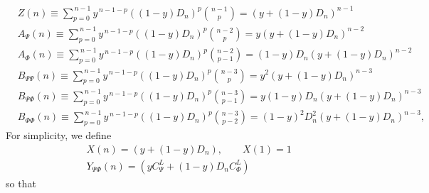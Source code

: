 \documentclass[11pt]{article}
\newcommand{\nn}{\nonumber}
\begin{document}
  \begin{align}
     & Z(n)\equiv \sum_{p=0}^{\,n-1}y^{\,n-1-p}((1-y)D_{n})^{p}\binom{n-1}{p}= (y+(1-y) D_{n})^{n-1}                                 \\
     & A_{\Psi}(n)\equiv \sum_{p=0}^{\,n-1}y^{\,n-1-p}((1-y)D_{n})^{p}\binom{n-2}{p}=y(y+(1-y) D_{n})^{n-2} \                       \\
     & A_{\Phi}(n)\equiv \sum_{p=0}^{\,n-1}y^{\,n-1-p}((1-y)D_{n})^{p}\binom{n-2}{p-1}=(1-y)D_{n}(y+(1-y) D_{n})^{n-2}              \\
     & B_{\Psi\Psi}(n)\equiv\sum_{p=0}^{\,n-1}y^{\,n-1-p}((1-y)D_{n})^{p}\binom{n-3}{p}= y^{2}(y+(1-y)D_{n})^{n-3}               \\
     & B_{\Psi\Phi}(n)\equiv\sum_{p=0}^{\,n-1}y^{\,n-1-p}((1-y)D_{n})^{p}\binom{n-3}{p-1}= y(1-y) D_{n}(y+(1-y)D_{n})^{n-3}       \\
     & B_{\Phi\Phi}(n)\equiv\sum_{p=0}^{\,n-1}y^{\,n-1-p}((1-y)D_{n})^{p}\binom{n-3}{p-2}= (1-y)^{2}D_{n}^{2}(y+(1-y)D_{n})^{n-3}, 
  \end{align} 
  For simplicity, we define
  \begin{align}
     & X(n)=(y+(1-y)D_{n}), \qquad X(1)=1\nn                 \\
     & Y_{\Psi\Phi}(n)=(y C_{\Psi}^L+(1-y)D_{n}C_{\Phi}^L) 
  \end{align}
  so that
\end{document}
